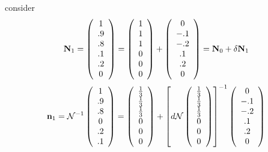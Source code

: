 \documentclass[aps,preprint]{revtex4}%
\begin{document}
consider%
\begin{equation}
\mathbf{N}_{1}=\left(
\begin{array}
[c]{c}%
1\\
.9\\
.8\\
.1\\
.2\\
0
\end{array}
\right)  =\left(
\begin{array}
[c]{c}%
1\\
1\\
1\\
0\\
0\\
0
\end{array}
\right)  +\left(
\begin{array}
[c]{c}%
0\\
-.1\\
-.2\\
.1\\
.2\\
0
\end{array}
\right)  =\mathbf{N}_{0}+\delta\mathbf{N}_{1}%
\end{equation}%
\begin{equation}
\mathbf{n}_{1}=\mathcal{N}^{-1}\left(
\begin{array}
[c]{c}%
1\\
.9\\
.8\\
0\\
.2\\
.1
\end{array}
\right)  =\left(
\begin{array}
[c]{c}%
\frac{1}{3}\\
\frac{1}{3}\\
\frac{1}{3}\\
0\\
0\\
0
\end{array}
\right)  +\left[  d\mathcal{N}\left(
\begin{array}
[c]{c}%
\frac{1}{3}\\
\frac{1}{3}\\
\frac{1}{3}\\
0\\
0\\
0
\end{array}
\right)  \right]  ^{-1}\left(
\begin{array}
[c]{c}%
0\\
-.1\\
-.2\\
.1\\
.2\\
0
\end{array}
\right)
\end{equation}%
\end{document}
